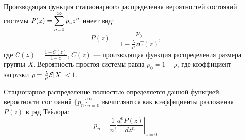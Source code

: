 \begin{statement}
Производящая функция стационарного распределения вероятностей состояний системы $P(z) = \displaystyle \sum_{n=0}^{\infty} p_n z^n$ имеет вид:
$$ P(z) = \frac{p_0}{1 - \frac{\lambda}{\mu} z \overline{C}(z)}, $$
где $\overline{C}(z) = \frac{1 - C(z)}{1 - z}$, $C(z)$ — производящая функция распределения размера группы $X$.
Вероятность простоя системы равна $p_0 = 1 - \rho$, где коэффициент загрузки $\rho = \frac{\lambda}{\mu}\mathcal{E}[X] < 1$.

Стационарное распределение полностью определяется данной функцией: вероятности состояний $\{p_n\}_{n=0}^{\infty}$ вычисляются как коэффициенты разложения $P(z)$ в ряд Тейлора:
$$ p_n = \frac{1}{n!} \left. \frac{d^n P(z)}{dz^n} \right|_{z=0}. $$
\end{statement}

